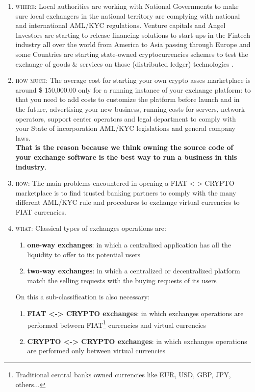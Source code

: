 \documentclass[11pt,fleqn,oneside]{book} %
\begin{document}
\begin{enumerate}
	\item \textsc{where}: Local authorities are working with National Governments to make sure local exchangers
	in the national territory are complying with national and international AML/KYC regulations.
	Venture capitals and Angel Investors are starting to release financing solutions to start-ups 
	in the Fintech industry all over the world from America to Asia passing through Europe and some 
	Countries are starting state-owned cryptocurrencies schemes to test the exchange of goods \& services
	on those (distributed ledger) technologies \cite{petro}.
	\item \textsc{how much}: The average cost for starting your own crypto asses marketplace is around \$ 150,000.00 only for a running instance of your exchange platform:
	to that you need to add costs to customize the platform before launch and in the future, advertising your new business, running costs for servers,
	network operators, support center operators and legal department to comply with your State of incorporation AML/KYC legislations and general company laws.\\
	\textbf{That is the reason because we think owning the source code of your exchange software is the best way to run a business in this industry}.
	\item \textsc{how}: The main problems encountered in opening a FIAT <-> CRYPTO marketplace is to find trusted
	banking partners to comply with the many different AML/KYC rule and procedures to exchange virtual currencies
	to FIAT currencies.
	\item \textsc{what}: Classical types of exchanges operations are: 
		\begin{enumerate}[label*=\arabic*.]
			\item \textbf{one-way exchanges}: in which a centralized application has all the liquidity to offer to its potential users
			\item \textbf{two-way exchanges}: in which a centralized or decentralized platform match the selling requests with the buying requests
			of its users
		\end{enumerate}
		On this a sub-classification is also necessary:
		\begin{enumerate}[label*=\arabic*.]
			\item \textbf{FIAT <-> CRYPTO exchanges}: in which exchanges operations are performed between FIAT\footnote{Traditional central banks owned currencies like EUR, USD, GBP, JPY, others...} 
			currencies and virtual currencies
			\item \textbf{CRYPTO <-> CRYPTO exchanges}: in which exchanges operations are performed only between virtual currencies

\end{enumerate}
\end{enumerate}
\end{document}
